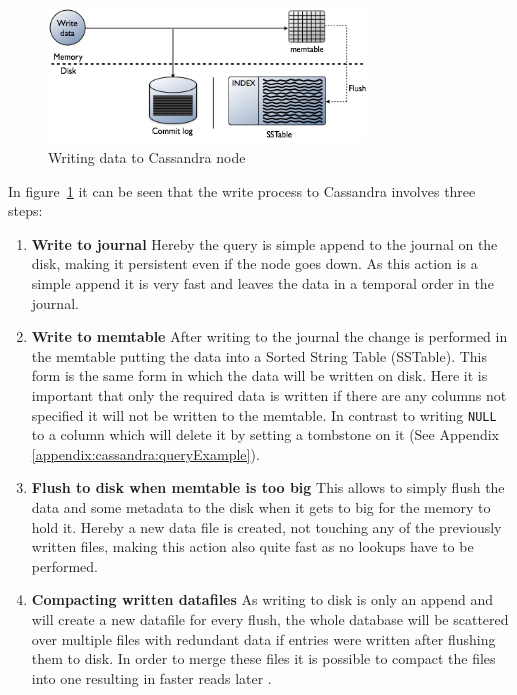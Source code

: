 \begin{figure}[ht]
    \centering
    \includegraphics[width=0.75\textwidth]{img/cassandra_local_write.png}
    \caption{Writing data to Cassandra node \autocite{datastaxWriteData}}
    \label{fig:cassandra:writeData}
\end{figure}
In figure~\ref{fig:cassandra:writeData} it can be seen that the write process to Cassandra involves three steps:
\begin{enumerate}
\item \textbf{Write to journal} Hereby the query is simple append to the journal on the disk, making it persistent even if the node goes down. As this action is a simple append it is very fast and leaves the data in a temporal order in the journal.
\item \textbf{Write to memtable} After writing to the journal the change is performed in the memtable putting the data into a Sorted String Table (SSTable). This form is the same form in which the data will be written on disk. Here it is important that only the required data is written if there are any columns not specified it will not be written to the memtable. In contrast to writing \texttt{NULL} to a column which will delete it by setting a tombstone on it (See Appendix \ref{appendix:cassandra:queryExample}).
\item \textbf{Flush to disk when memtable is too big} This allows to simply flush the data and some metadata to the disk when it gets to big for the memory to hold it. Hereby a new data file is created, not touching any of the previously written files, making this action also quite fast as no lookups have to be performed.
\item \textbf{Compacting written datafiles} As writing to disk is only an append and will create a new datafile for every flush, the whole database will be scattered over multiple files with redundant data if entries were written after flushing them to disk. In order to merge these files it is possible to compact the files into one resulting in faster reads later \autocite{cassandraCompactTool}.
\end{enumerate}

